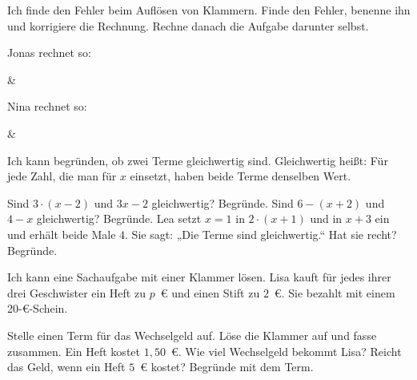 \begin{aufgabe}{Ich finde den Fehler beim Auflösen von Klammern. Finde den Fehler, benenne ihn und korrigiere die Rechnung. Rechne danach die Aufgabe darunter selbst.}
\begin{teile}
\teil Jonas rechnet so:
\end{teile}
\begin{gleichungsraster}[2]
 & \\ \noalign{\vspace{5mm}}
\end{gleichungsraster}
\begin{teile}
\teil Nina rechnet so:
\end{teile}
\begin{gleichungsraster}[2]
 & \\ \noalign{\vspace{5mm}}
\end{gleichungsraster}
\end{aufgabe}

\begin{aufgabe}{Ich kann begründen, ob zwei Terme gleichwertig sind. Gleichwertig heißt: Für jede Zahl, die man für $x$ einsetzt, haben beide Terme denselben Wert.}
\begin{teile}
\teil Sind $3 \cdot (x - 2)$ und $3x - 2$ gleichwertig? Begründe.
\teil Sind $6 - (x + 2)$ und $4 - x$ gleichwertig? Begründe.
\teil Lea setzt $x = 1$ in $2 \cdot (x + 1)$ und in $x + 3$ ein und erhält beide Male $4$. Sie sagt: „Die Terme sind gleichwertig.“ Hat sie recht? Begründe.
\end{teile}
\end{aufgabe}

\begin{aufgabe}{Ich kann eine Sachaufgabe mit einer Klammer lösen. Lisa kauft für jedes ihrer drei Geschwister ein Heft zu $p$~€ und einen Stift zu $2$~€. Sie bezahlt mit einem 20-€-Schein.}
\begin{teile}
\teil Stelle einen Term für das Wechselgeld auf.
\teil Löse die Klammer auf und fasse zusammen.
\teil Ein Heft kostet $1{,}50$~€. Wie viel Wechselgeld bekommt Lisa?
\teil Reicht das Geld, wenn ein Heft $5$~€ kostet? Begründe mit dem Term.
\end{teile}
\end{aufgabe}
